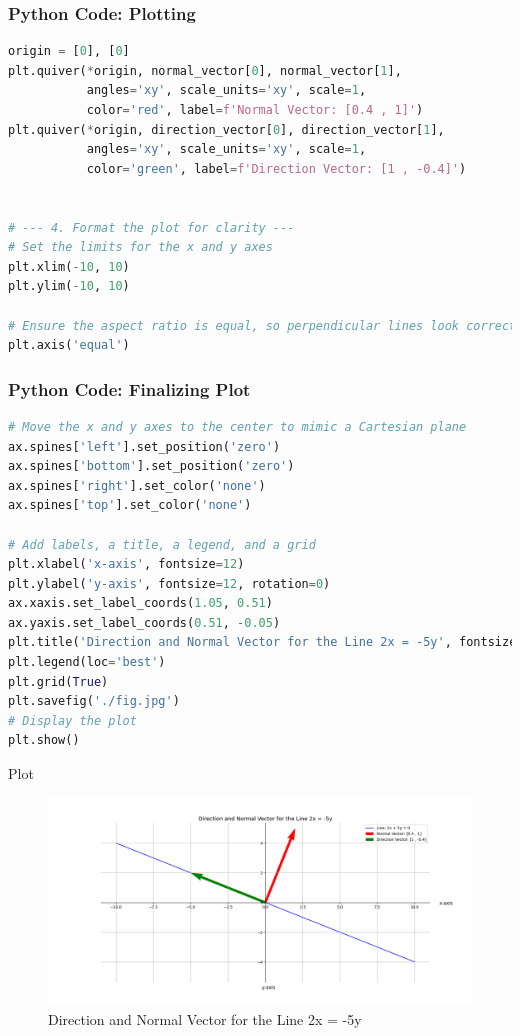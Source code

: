\documentclass{beamer}
\begin{document}
\begin{frame}[fragile]
    \frametitle{Python Code: Plotting}
    \begin{lstlisting}[language=Python]
origin = [0], [0]
plt.quiver(*origin, normal_vector[0], normal_vector[1], 
           angles='xy', scale_units='xy', scale=1, 
           color='red', label=f'Normal Vector: [0.4 , 1]')
plt.quiver(*origin, direction_vector[0], direction_vector[1], 
           angles='xy', scale_units='xy', scale=1, 
           color='green', label=f'Direction Vector: [1 , -0.4]')


# --- 4. Format the plot for clarity ---
# Set the limits for the x and y axes
plt.xlim(-10, 10)
plt.ylim(-10, 10)

# Ensure the aspect ratio is equal, so perpendicular lines look correct
plt.axis('equal')
    \end{lstlisting}
\end{frame}

\begin{frame}[fragile]
    \frametitle{Python Code: Finalizing Plot}
    \begin{lstlisting}[language=Python]
# Move the x and y axes to the center to mimic a Cartesian plane
ax.spines['left'].set_position('zero')
ax.spines['bottom'].set_position('zero')
ax.spines['right'].set_color('none')
ax.spines['top'].set_color('none')

# Add labels, a title, a legend, and a grid
plt.xlabel('x-axis', fontsize=12)
plt.ylabel('y-axis', fontsize=12, rotation=0)
ax.xaxis.set_label_coords(1.05, 0.51)
ax.yaxis.set_label_coords(0.51, -0.05)
plt.title('Direction and Normal Vector for the Line 2x = -5y', fontsize=14)
plt.legend(loc='best')
plt.grid(True)
plt.savefig('./fig.jpg')
# Display the plot
plt.show()
    \end{lstlisting}
\end{frame}

\begin{frame}{Plot}
    \begin{figure}
        \centering
        \includegraphics[width=\columnwidth]{../figs/figure_py.png}
        \caption{Direction and Normal Vector for the Line 2x = -5y}
        \label{fig:final_plot}
    \end{figure}
\end{frame}
\end{document}
